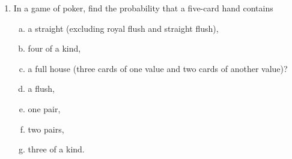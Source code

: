 \documentclass[12pt]{article}
\begin{document}
\begin{enumerate}[1.]
\item In a game of poker, find the probability that a five-card hand contains
  \begin{enumerate}[(a)]
  \item a straight (excluding royal flush and straight flush),
  \item four of a kind,
  \item a full house (three cards of one value and two cards of
    another value)?
  \item a flush,
  \item one pair,
  \item two pairs,
  \item three of a kind.
  \end{enumerate}

\end{enumerate}

\end{document}
